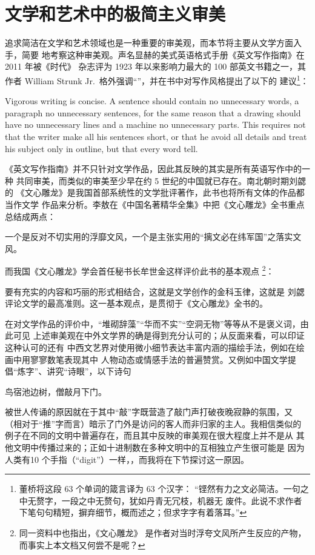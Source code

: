 \section{文学和艺术中的极简主义审美}\label{sec:art}

追求简洁在文学和艺术领域也是一种重要的审美观，而本节将主要从文学方面入手，简要
地考察这种审美观。声名显赫的美式英语格式手册《英文写作指南》在 2011 年被《时代》
杂志评为 1923 年以来影响力最大的 100 部英文书籍之一，其作者 William Strunk
Jr.\ 格外强调“”，并在书中对写作风格提出了以下的
建议\footnote{董桥将这段 63 个单词的箴言译为 63 个汉字：
“铿然有力之文必简洁。一句之中无赘字，一段之中无赘句，犹如丹青无冗枝，机器无
废件。此说不求作者下笔句句精短，摒弃细节，概而述之；但求字字有着落耳。”}：
\begin{quoting}
	Vigorous writing is concise.  A sentence should contain no
	unnecessary words, a paragraph no unnecessary sentences, for the
	same reason that a drawing should have no unnecessary lines and
	a machine no unnecessary parts.  This requires not that the writer
	make all his sentences short, or that he avoid all details and
	treat his subject only in outline, but that every word tell.
\end{quoting}

《英文写作指南》并不只针对文学作品，因此其反映的其实是所有英语写作中的一种
共同审美，而类似的审美至少早在约 5 世纪的中国就已存在。南北朝时期刘勰的
《文心雕龙》是我国首部系统性的文学批评著作，此书也将所有文体的作品都当作文学
作品来分析。李敖在《中国名著精华全集》中把《文心雕龙》全书重点总结成两点：
\begin{quoting}
	一个是反对不切实用的浮靡文风，一个是主张实用的“摛文必在纬军国”之落实文风。
\end{quoting}
而我国《文心雕龙》学会首任秘书长牟世金这样评价此书的基本观点%
\footnote{同一资料中也指出，《文心雕龙》
是作者对当时浮夸文风所产生反应的产物，而事实上本文档又何尝不是呢？}：
\begin{quoting}
	要有充实的内容和巧丽的形式相结合，这就是文学创作的金科玉律，这就是
	刘勰评论文学的最高准则。这一基本观点，是贯彻于《文心雕龙》全书的。
\end{quoting}

在对文学作品的评价中，“堆砌辞藻”“华而不实”“空洞无物”等等从不是褒义词，由此可见
上述审美观在中外文学界的确是得到充分认可的；从反面来看，可以印证这种认可的还有
中西文艺界对使用微小细节表达丰富内涵的描绘手法，例如在绘画中用寥寥数笔表现其中
人物动态或情感手法的普遍赞赏。又例如中国文学提倡“炼字”、讲究“诗眼”，以下诗句
\begin{quoting}
	鸟宿池边树，僧敲月下门。
\end{quoting}
被世人传诵的原因就在于其中“敲”字既营造了敲门声打破夜晚寂静的氛围，又
（相对于“推”字而言）暗示了门外是访问的客人而非归家的主人。我相信类似的
例子在不同的文明中普遍存在，而且其中反映的审美观在很大程度上并不是从
其他文明中传播过来的；正如十进制数在多种文明中的互相独立产生很可能是
因为人类有10 个手指（“digit”）一样，，而我将在下节探讨这一原因。

